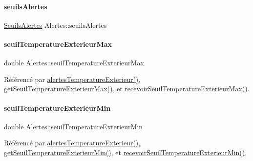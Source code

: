 \paragraph{\texorpdfstring{seuils\+Alertes}{seuilsAlertes}}
{\footnotesize\ttfamily \hyperlink{parametres_8h_aaa6de8207c94675264c90b10b613368d}{Seuils\+Alertes} Alertes\+::seuils\+Alertes\hspace{0.3cm}{\ttfamily [private]}}

\mbox{\label{class_alertes_a207e0266c68ad378dae846382ba9f9dc}} 
\paragraph{\texorpdfstring{seuil\+Temperature\+Exterieur\+Max}{seuilTemperatureExterieurMax}}
{\footnotesize\ttfamily double Alertes\+::seuil\+Temperature\+Exterieur\+Max\hspace{0.3cm}{\ttfamily [private]}}



Référencé par \hyperlink{class_alertes_a91fb2665fa8b6c32c74bfe4d1b89a2d8}{alertes\+Temperature\+Exterieur()}, \hyperlink{class_alertes_a00d834877e1fc34d7e0659ef6963ac4f}{get\+Seuil\+Temperature\+Exterieur\+Max()}, et \hyperlink{class_alertes_af896e03da2f2ec319d410fb8dcc89e0e}{recevoir\+Seuil\+Temperature\+Exterieur\+Max()}.

\mbox{\label{class_alertes_a0898c501edf5f07ac503b31b8a3d2454}} 
\paragraph{\texorpdfstring{seuil\+Temperature\+Exterieur\+Min}{seuilTemperatureExterieurMin}}
{\footnotesize\ttfamily double Alertes\+::seuil\+Temperature\+Exterieur\+Min\hspace{0.3cm}{\ttfamily [private]}}



Référencé par \hyperlink{class_alertes_a91fb2665fa8b6c32c74bfe4d1b89a2d8}{alertes\+Temperature\+Exterieur()}, \hyperlink{class_alertes_a4451c6b077256d838e584a073444d83d}{get\+Seuil\+Temperature\+Exterieur\+Min()}, et \hyperlink{class_alertes_ad88c760d06e1d438a57027857d50a77f}{recevoir\+Seuil\+Temperature\+Exterieur\+Min()}.

